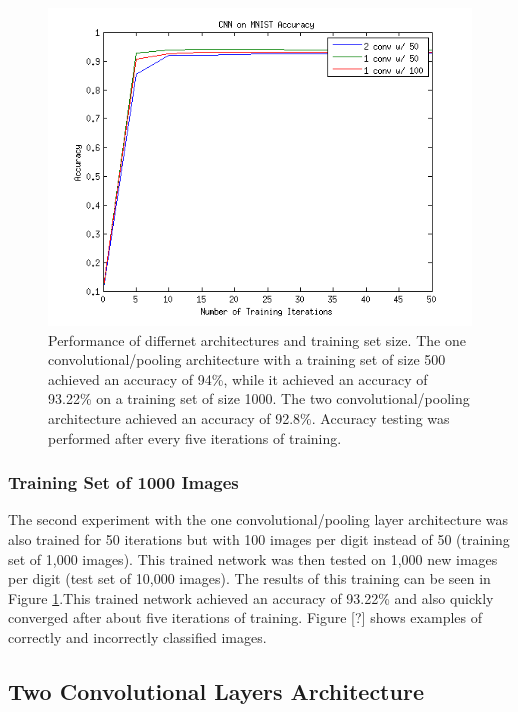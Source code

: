 \documentclass[10pt,twocolumn,letterpaper]{article}
\begin{document}
\begin{figure}
  \includegraphics[scale=0.55]{AccPlot}
  \caption{Performance of differnet architectures and training set size. The one convolutional/pooling architecture with a training set 
  of size 500 achieved an accuracy of 94\%, while it achieved an accuracy of 93.22\% on a training set of size 1000. The two convolutional/pooling
  architecture achieved an accuracy of 92.8\%. Accuracy testing was performed after every five iterations of training.}
  \label{fig:accplot}
\end{figure}

\subsubsection{Training Set of 1000 Images}

The second experiment with the one convolutional/pooling layer architecture was also trained
for 50 iterations but with 100 images per digit instead of 50 (training set of 1,000 images).
This trained network was then tested on 1,000 new images per digit (test set of 10,000 images).
The results of this training can be seen in Figure \ref{fig:accplot}.This trained network 
achieved an accuracy of 93.22\% and also quickly converged after about five iterations of training.
Figure [?] shows examples of correctly and incorrectly classified images.

\subsection{Two Convolutional Layers Architecture}
\end{document}
